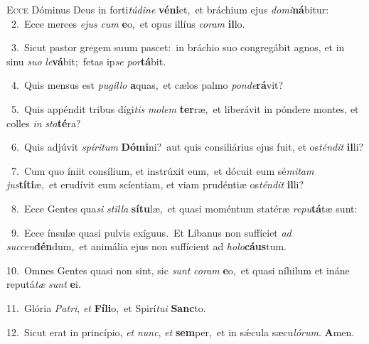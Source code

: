 \lettrine{\initial\textcolor{\initialcolor}{E}}{cce} Dóminus Deus in forti\-\textit{tú}\-\textit{di}\textit{ne} \textbf{vé}\-\textbf{ni}et,~\star et bráchium ejus \textit{do}\-\textit{mi}\textbf{ná}bitur:\\
{\numbfont\textcolor{\numbcolor}{~2.}}~Ecce merces \textit{e}\-\textit{jus} \textit{cum} \textbf{e}\-o,~\star et opus illíus \textit{co}\-\textit{ram} \textbf{il}\-lo.\par
{\numbfont\textcolor{\numbcolor}{~3.}}~Sicut pastor gregem suum pascet:~\dagger in bráchio suo congregábit agnos, et in sinu \textit{su}\-\textit{o} \textit{le}\-\textbf{vá}bit;~\star fetas ip\textit{se} \textit{por}\-\textbf{tá}bit.\par
{\numbfont\textcolor{\numbcolor}{~4.}}~Quis mensus est \textit{pu}\-\textit{gíl}\textit{lo} \textbf{a}\-quas,~\star et cælos palmo \textit{pon}\-\textit{de}\textbf{rá}vit?\par
{\numbfont\textcolor{\numbcolor}{~5.}}~Quis appéndit tribus dígi\textit{tis} \textit{mo}\-\textit{lem} \textbf{ter}\-ræ,~\star et liberávit in póndere montes, et colles \textit{in} \textit{sta}\-\textbf{té}ra?\par
{\numbfont\textcolor{\numbcolor}{~6.}}~Quis adjúvit \textit{spí}\-\textit{ri}\textit{tum} \textbf{Dó}\-\textbf{mi}ni?~\star aut quis consiliárius ejus fuit, et os\-\textit{tén}\-\textit{dit} \textbf{il}\-li?\par
{\numbfont\textcolor{\numbcolor}{~7.}}~Cum quo íniit consílium, et instrúxit eum,~\dagger et dócuit eum sé\-\textit{mi}\-\textit{tam} \textit{jus}\-\textbf{tí}\textbf{ti}æ,~\star et erudívit eum scíentiam, et viam prudéntiæ os\-\textit{tén}\-\textit{dit} \textbf{il}\-li?\par
{\numbfont\textcolor{\numbcolor}{~8.}}~Ecce Gentes qua\textit{si} \textit{stil}\-\textit{la} \textbf{sí}\-\textbf{tu}læ,~\star et quasi moméntum statéræ \textit{re}\-\textit{pu}\textbf{tá}tæ sunt:\par
{\numbfont\textcolor{\numbcolor}{~9.}}~Ecce ínsulæ quasi pulvis exíguus.~\dagger Et Líbanus non suffíciet \textit{ad} \textit{suc}\-\textit{cen}\textbf{dén}dum,~\star et animália ejus non suffícient ad \textit{ho}\-\textit{lo}\textbf{cáus}tum.\par
{\numbfont\textcolor{\numbcolor}{10.}}~Omnes Gentes quasi non sint, sic \textit{sunt} \textit{co}\-\textit{ram} \textbf{e}\-o,~\star et quasi níhilum et ináne reputá\textit{tæ} \textit{sunt} \textbf{e}\-i.\par
{\numbfont\textcolor{\numbcolor}{11.}}~Glória \textit{Pa}\-\textit{tri}, \textit{et} \textbf{Fí}\-\textbf{li}o,~\star et Spirí\-\textit{tu}\-\textit{i} \textbf{Sanc}\-to.\par
{\numbfont\textcolor{\numbcolor}{12.}}~Sicut erat in princípio, \textit{et} \textit{nunc}\-, \textit{et} \textbf{sem}\-per,~\star et in sǽcula sæcu\-\textit{ló}\-\textit{rum}. \textbf{A}\-men.\par

